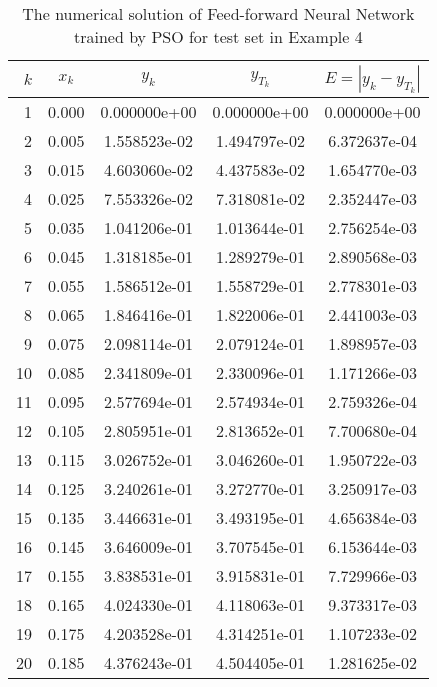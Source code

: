 \begin{table}[ht]
  \caption{The numerical solution of Feed-forward Neural Network trained by PSO for test set in Example 4}
  \centering
  \begin{tabular}{rcccc}
    $k$ & $x_{k}$ & $y_{k}$ & $y_{T_{k}}$ & $E=|y_{k} - y_{T_{k}}|$\\
    \hline\hline
     1 &  0.000 &    0.000000e+00 &    0.000000e+00  &     0.000000e+00\\ 
     2 &  0.005 &    1.558523e-02 &    1.494797e-02  &     6.372637e-04\\ 
     3 &  0.015 &    4.603060e-02 &    4.437583e-02  &     1.654770e-03\\ 
     4 &  0.025 &    7.553326e-02 &    7.318081e-02  &     2.352447e-03\\ 
     5 &  0.035 &    1.041206e-01 &    1.013644e-01  &     2.756254e-03\\ 
     6 &  0.045 &    1.318185e-01 &    1.289279e-01  &     2.890568e-03\\ 
     7 &  0.055 &    1.586512e-01 &    1.558729e-01  &     2.778301e-03\\ 
     8 &  0.065 &    1.846416e-01 &    1.822006e-01  &     2.441003e-03\\ 
     9 &  0.075 &    2.098114e-01 &    2.079124e-01  &     1.898957e-03\\ 
    10 &  0.085 &    2.341809e-01 &    2.330096e-01  &     1.171266e-03\\ 
    11 &  0.095 &    2.577694e-01 &    2.574934e-01  &     2.759326e-04\\ 
    12 &  0.105 &    2.805951e-01 &    2.813652e-01  &     7.700680e-04\\ 
    13 &  0.115 &    3.026752e-01 &    3.046260e-01  &     1.950722e-03\\ 
    14 &  0.125 &    3.240261e-01 &    3.272770e-01  &     3.250917e-03\\ 
    15 &  0.135 &    3.446631e-01 &    3.493195e-01  &     4.656384e-03\\ 
    16 &  0.145 &    3.646009e-01 &    3.707545e-01  &     6.153644e-03\\ 
    17 &  0.155 &    3.838531e-01 &    3.915831e-01  &     7.729966e-03\\ 
    18 &  0.165 &    4.024330e-01 &    4.118063e-01  &     9.373317e-03\\ 
    19 &  0.175 &    4.203528e-01 &    4.314251e-01  &     1.107233e-02\\ 
    20 &  0.185 &    4.376243e-01 &    4.504405e-01  &     1.281625e-02\\ 

\end{tabular}
\end{table}
